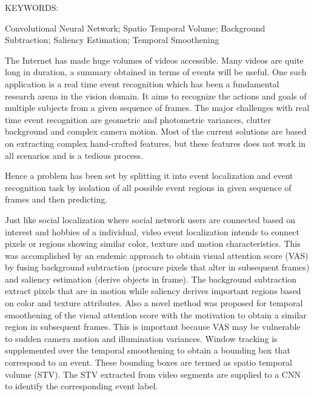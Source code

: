 \abstract

\noindent KEYWORDS: \hspace*{0.5em} \parbox[t]{4.4in}{Convolutional Neural Network; Spatio Temporal Volume; Background Subtraction; Saliency Estimation; Temporal Smoothening}

\vspace*{24pt}
The Internet has made huge volumes of videos accessible.   Many videos are quite long in duration, a summary obtained in terms of events will be useful.
One such application is a real time event recognition which has been a fundamental research arena in the vision domain. It aims to recognize the actions and goals of multiple subjects from a given sequence of frames. The major challenges with real time event recognition are geometric and photometric variances, clutter background and complex camera motion. Most of the current solutions are based on extracting complex hand-crafted features, but these features does not work in all scenarios and is a tedious process. 

\par Hence a problem has been set by splitting it into event localization and event recognition task by isolation of all possible event regions in given sequence of frames and then predicting. 

\par Just like social localization where social network users are connected based on interest and hobbies of a individual, video event localization intends to connect pixels or regions showing similar color, texture and motion characteristics.  This was accomplished by an endemic approach to obtain visual attention score (VAS) by fusing background subtraction (procure pixels that alter in subsequent frames) and saliency estimation (derive objects in frame). The background subtraction extract pixels that are in motion while saliency  derives important regions based on color and texture attributes. Also a  novel method was proposed for temporal smoothening of the visual attention score  with the motivation to obtain a similar region in subsequent frames. This is important because VAS may be vulnerable to sudden camera motion and illumination variances.  Window tracking is supplemented over the temporal smoothening to obtain a bounding box that correspond to an event. These bounding boxes are termed as spatio temporal volume (STV). The STV extracted from video segments are supplied to a CNN to identify the corresponding event label.

